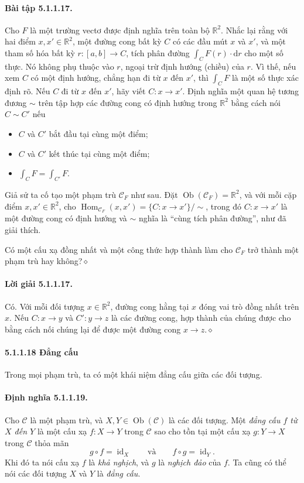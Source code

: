 \paragraph{Bài tập 5.1.1.17.} Cho $F$ là một trường vectơ được định nghĩa trên toàn bộ $\mathbb R^2$. Nhắc lại rằng với hai điểm $x,x'\in\mathbb R^2$, một đường cong bất kỳ $C$ có các đầu mút $x$ và $x'$, và một tham số hóa bất kỳ $r:[a,b]\to C$, tích phân đường $\int_C F(r)\cdot\mathrm dr$ cho một số thực. Nó không phụ thuộc vào $r$, ngoại trừ định hướng (chiều) của $r$. Vì thế, nếu xem $C$ có một định hướng, chẳng hạn đi từ $x$ đến $x'$, thì $\int_C F$ là một số thực xác định rõ. Nếu $C$ đi từ $x$ đến $x'$, hãy viết $C:x\to x'$. Định nghĩa một quan hệ tương đương $\sim$ trên tập hợp các đường cong có định hướng trong $\mathbb R^2$ bằng cách nói $C\sim C'$ nếu
\begin{itemize}
\item $C$ và $C'$ bắt đầu tại cùng một điểm;
\item $C$ và $C'$ kết thúc tại cùng một điểm;
\item $\int_C F=\int_{C'}F$.
\end{itemize}
Giả sử ta cố tạo một phạm trù $\mathcal C_F$ như sau. Đặt $\operatorname{Ob}(\mathcal C_F)=\mathbb R^2$, và với mỗi cặp điểm $x,x'\in\mathbb R^2$, cho $\operatorname{Hom}_{\mathcal C_F}(x,x')=\{C:x\to x'\}/{\sim}$, trong đó $C:x\to x'$ là một đường cong có định hướng và $\sim$ nghĩa là ``cùng tích phân đường'', như đã giải thích.

Có một cấu xạ đồng nhất và một công thức hợp thành làm cho $\mathcal C_F$ trở thành một phạm trù hay không?\hfill$\diamond$
\paragraph{Lời giải 5.1.1.17.} Có. Với mỗi đối tượng $x\in\mathbb R^2$, đường cong hằng tại $x$ đóng vai trò đồng nhất trên $x$. Nếu $C:x\to y$ và $C':y\to z$ là các đường cong, hợp thành của chúng được cho bằng cách nối chúng lại để được một đường cong $x\to z$.\hfill$\diamond$
\paragraph{5.1.1.18 Đẳng cấu}
Trong mọi phạm trù, ta có một khái niệm đẳng cấu giữa các đối tượng.
\paragraph{Định nghĩa 5.1.1.19.} Cho $\mathcal C$ là một phạm trù, và $X,Y\in\operatorname{Ob}(\mathcal C)$ là các đối tượng. Một \emph{đẳng cấu $f$ từ $X$ đến $Y$} là một cấu xạ $f:X\to Y$ trong $\mathcal C$ sao cho tồn tại một cấu xạ $g:Y\to X$ trong $\mathcal C$ thỏa mãn
\[g\circ f=\operatorname{id}_X\qquad\text{và}\qquad f\circ g=\operatorname{id}_Y.\]
Khi đó ta nói cấu xạ $f$ là \emph{khả nghịch}, và $g$ là \emph{nghịch đảo} của $f$. Ta cũng có thể nói các đối tượng $X$ và $Y$ là \emph{đẳng cấu}.
